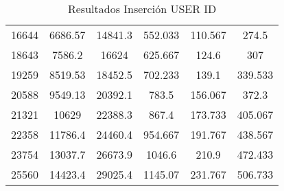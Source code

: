 \begin{table}[H]
\begin{tabular}{cccccc}
16644               & 6686.57      & 14841.3      & 552.033      & 110.567      & 274.5         \\
18643               & 7586.2       & 16624        & 625.667      & 124.6        & 307           \\
19259               & 8519.53      & 18452.5      & 702.233      & 139.1        & 339.533       \\
20588               & 9549.13      & 20392.1      & 783.5        & 156.067      & 372.3         \\
21321               & 10629        & 22388.3      & 867.4        & 173.733      & 405.067       \\
22358               & 11786.4      & 24460.4      & 954.667      & 191.767      & 438.567       \\
23754               & 13037.7      & 26673.9      & 1046.6       & 210.9        & 472.433       \\
25560               & 14423.4      & 29025.4      & 1145.07      & 231.767      & 506.733       \\ \hline
\end{tabular}
\caption{Resultados Inserción USER ID}
\label{tab:insercion_user_id_all}
\end{table}

